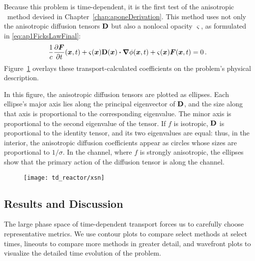 Because this problem is time-dependent, it is the first test of the anisotropic
\Pone\ method devised in Chapter~\ref{chap:aponeDerivation}. This method
uses not only the anisotropic diffusion tensors $\mathbf{D}$ but also a nonlocal
opacity $\varsigma$, as formulated in \eqref{eq:ap1FicksLawFinal}:
\begin{equation*}
  \frac{1}{c}\frac{\partial \bm{F}}{\partial t}(\bm{x},t)
  + \varsigma(\bm{x}) \mathbf{D}(\bm{x}) \bm{\cdot} \bm{\nabla} \phi(\bm{x}, t)
  + \varsigma(\bm{x})\bm{F}(\bm{x},t) 
  = 0 \,.
\end{equation*}
Figure~\ref{fig:tdReactorProblem} overlays these transport-calculated
coefficients on the problem's physical description.

In this figure, the anisotropic diffusion tensors are plotted as ellipses. Each
ellipse's major axis
lies along the principal eigenvector of $\mathbf{D}$, and the size along that axis is
proportional to the corresponding eigenvalue. The minor axis is proportional to
the second eigenvalue of the tensor. If $f$ is isotropic, $\mathbf{D}$ is
proportional to the identity tensor, and its two eigenvalues are equal: thus, in
the interior, the anisotropic diffusion coefficients appear as circles whose
sizes are proportional to $1/\sigma$. In the channel, where $f$ is strongly
anisotropic, the ellipses show that the primary action of the diffusion
tensor is along the channel.

\begin{figure}[htb]
  \centering
  \texttt{[image: td\_reactor/xsn]}
  \label{fig:tdReactorProblem}
\end{figure}

\subsection{Results and Discussion}

The large phase space of time-dependent transport forces us to carefully choose
representative metrics. We use contour plots to compare select methods at
select times, lineouts to compare more methods in greater detail, and wavefront
plots to visualize the detailed time evolution of the problem.


